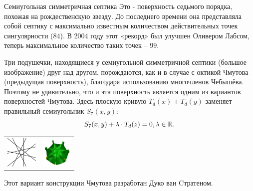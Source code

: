 \begin{surferPage}{Семиугольная симметричная септика}
Это - поверхность седьмого порядка, похожая на рождественскую звезду. До последнего времени она представляла собой септику с максимально известным количеством действительных точек сингулярности ($84$). В 2004 году этот «рекорд» был улучшен Оливером Лабсом, теперь максимальное количество таких точек – $99$.  
  
Три подушечки, находящиеся у семиугольной симметричной септики (большое изображение) друг над другом, порождаются, как и в случае с октикой Чмутова (предыдущая поверхность), благодаря использованию многочленов Чебышёва. Поэтому не удивительно, что и эта поверхность является одним из вариантов поверхностей Чмутова. Здесь плоскую кривую $T_d(x)+T_d(y)$ заменяет правильный семиугольник
    $S_7(x,y)$: 
   \[S_7(x,y) + \lambda \cdot T_d(z) = 0,\lambda\in{\mathbb R}.\]
    \vspace*{-1.75em}
    \begin{center}
      \begin{tabular}{c@{\qquad}c}
        \includegraphics[height=1.5cm]{./../../common/images/labsseptic1.pdf}
        &
        \includegraphics[height=1.5cm]{./../../common/images/septic_7eck_von_oben}
      \end{tabular}
    \end{center}
    \vspace*{-0.3em}   
	Этот вариант конструкции Чмутова разработан Дуко ван Cтратеном.
\end{surferPage}
